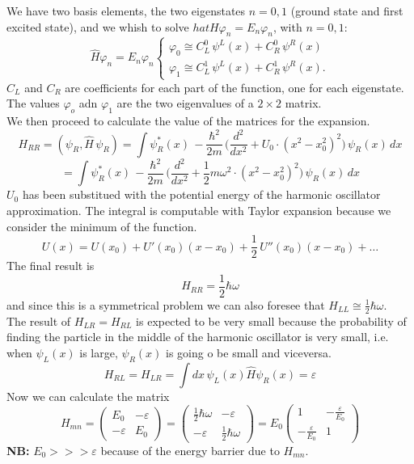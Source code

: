 We have two basis elements, the two eigenstates $n=0,1$ (ground state and first excited state), and we whish to solve $hat{H}\varphi_n=E_n\varphi_n$, with $n=0,1$:
\[
\hat{H}\varphi_n=E_n\varphi_n
\begin{cases}
\varphi_0 \cong C_L^0\,\psi^L(x)+C_R^0\,\psi^R(x)\\
\varphi_1 \cong C_L^1\,\psi^L(x)+C_R^1\,\psi^R(x).
\end{cases}
\]
$C_L$ and $C_R$ are coefficients for each part of the function, one for each eigenstate. The values $\varphi_o$ adn $\varphi_1$ are the two eigenvalues of a $2 \times 2 $ matrix.\\
We then proceed to calculate the value of the matrices for the expansion.\\
\[
H_{RR}=(\psi_R,\hat{H}\,\psi_R)= \int\psi_R^*(x)\,-\frac{\hbar^2}{2m}\,\bigg(\frac{d^2}{dx^2}+U_0\cdot(x^2-x_0^2)^2\bigg)\,\psi_R(x)\,dx\]
\[
=\int\psi_R^*(x)\,-\frac{\hbar^2}{2m}\,\bigg  (\frac{d^2}{dx^2}+\frac{1}{2}m\omega^2\cdot(x^2-x_0^2)^2\bigg)\,\psi_R(x)\,dx
\]
$U_0$ has been substitued with the potential energy of the harmonic oscillator approximation. The integral is computable with Taylor expansion because we consider the minimum of the function.
\[
U(x)=U(x_0)+U'(x_0)(x-x_0)+\frac{1}{2}\,U''(x_0)(x-x_0)+\dots\]
The final result is
\[
H_{RR}=\frac{1}{2}\hbar\omega
\]
and since this is a symmetrical problem we can also foresee that $H_{LL}\cong\frac{1}{2}\hbar\omega$.\\
The result of $H_{LR}=H_{RL}$ is expected to be very small because the probability of finding the particle in the middle of the harmonic oscillator is very small, i.e. when $\psi_L(x)$ is large, $\psi_R(x)$ is going o be small and viceversa. 
\[
H_{RL}=H_{LR}=\int dx\,\psi_L(x)\hat{H}\psi_R(x) = \varepsilon
\]
Now we can calculate the matrix
\[
H_{mn}=
\begin{pmatrix}
E_0 & -\varepsilon\\
-\varepsilon & E_0
\end{pmatrix}
=
\begin{pmatrix}
\frac{1}{2}\hbar\omega & -\varepsilon\\
-\varepsilon & \frac{1}{2}\hbar\omega
\end{pmatrix}
=
E_0
\begin{pmatrix}
1 & -\frac{\varepsilon}{E_0}\\
-\frac{\varepsilon}{E_0} & 1
\end{pmatrix}
\]
\textbf{NB:} $E_0>>>\varepsilon$ because of the energy barrier due to $H_{mn}$.
\newline
